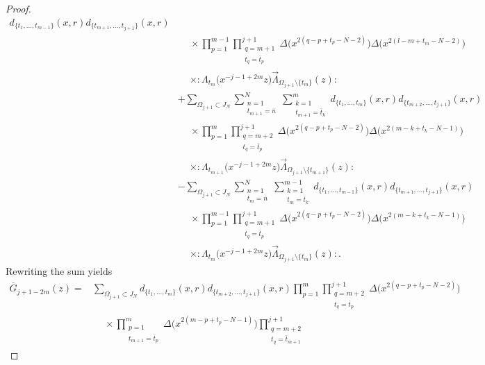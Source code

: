 \documentclass[pdftex]{sigma}
\numberwithin{equation}{section}
\begin{document}
\begin{proof}
\begin{align*}
d_{\{t_1,\dots, t_{m-1}\}}(x,r) d_{\{t_{m+1},\dots, t_{j+1}\}}(x,r)
\\
&\phantom{-}\times \prod_{p=1}^{m-1}\prod\limits_{\substack{q=m+1\\t_q=\overline{t}_p}}^{j+1}
\Delta\big(x^{2(q-p+t_p-N-2)}\big)\Delta\big(x^{2(l-m+t_m-N-2)}\big)
\\
&\phantom{-}\times {:}\Lambda_{t_{m}}\big(x^{-j-1+2m}z\big)
\overrightarrow{\Lambda}_{\Omega_{j+1}\setminus \{t_m\}}(z){:}
\\
&+\sum_{\Omega_{j+1} \subset J_N}
\sum\limits_{\substack{n=1\\t_{m+1}=\overline{n}}}^N
\sum\limits_{\substack{k=1\\t_{m+1}=\overline{t}_k}}^m
d_{\{t_1,\dots, t_m\}}(x,r) d_{\{t_{m+2}, \dots, t_{j+1}\}}(x,r)
\\
&\phantom{-}\times
\prod_{p=1}^m\prod\limits_{\substack{q=m+2\\t_q=\overline{t}_p}}^{j+1}
\Delta\big(x^{2(q-p+t_p-N-2)}\big)\Delta\big(x^{2(m-k+t_k-N-1)}\big)
\\
&\phantom{-}\times{:}\Lambda_{t_{m+1}}\big(x^{-j-1+2m}z\big)
\overrightarrow{\Lambda}_{\Omega_{j+1}\setminus \{t_{m+1}\}}(z){:}
\\
&-\sum_{\Omega_{j+1}\subset J_N}
\sum\limits_{\substack{n=1\\t_m=\overline{n}}}^N
\sum\limits_{\substack{k=1\\t_m=\overline{t}_k}}^{m-1}
d_{\{t_1, \dots, t_{m-1}\}}(x,r) d_{\{t_{m+1}, \dots, t_{j+1}\}}(x,r)
\\
&\phantom{-}\times\prod_{p=1}^{m-1}\prod\limits_{\substack{q=m+1\\t_q=\overline{t}_p}}^{j+1}
\Delta\big(x^{2(q-p+t_p-N-2)}\big)
\Delta\big(x^{2(m-k+t_k-N-1)}\big)
\\
&\phantom{-}\times{:}\Lambda_{t_{m}}\big(x^{-j-1+2m}z\big)
\overrightarrow{\Lambda}_{\Omega_{j+1}\setminus \{t_m\}}(z){:}.
\end{align*}
Rewriting the sum yields
\begin{align*}
\overline{G}_{j+1-2m}(z)={}&
\sum_{\Omega_{j+1}\subset J_N}
d_{\{t_1,\dots,t_m\}}(x,r) d_{\{t_{m+2},\dots,t_{j+1}\}}(x,r)
\prod_{p=1}^m \prod\limits_{\substack{q=m+2
\\t_q=\overline{t}_p}}^{j+1}\Delta\big(x^{2(q-p+t_p-N-2)}\big)
\\
&\phantom{-}\times\prod\limits_{\substack{p=1\\t_{m+1}=\overline{t}_p}}^m
\Delta\big(x^{2(m-p+t_p-N-1)}\big)
\prod\limits_{\substack{q=m+2\\t_q=\overline{t}_{m+1}}}^{j+1}

\end{align*}
\end{proof}
\end{document}
